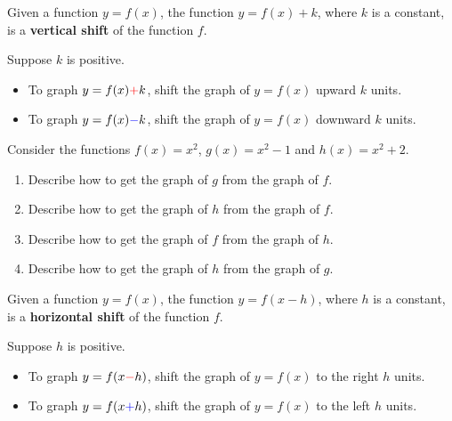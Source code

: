 \begin{definition}
  Given a function \(y=f(x)\), the function \(y=f(x)+k\), where \(k\) is a constant, is a \textbf{vertical shift} of the function \(f\). 
\end{definition}

\begin{howto}
  Suppose $k$ is positive. 
\begin{itemize}
  \item To graph $y=f(x) {\color{red} +}k$, shift the graph of $y=f(x)$ {\color{red}upward} $k$ units. 
  \item To graph $y=f(x) {\color{blue} -}k$, shift the graph of $y=f(x)$ {\color{blue}downward} $k$ units. 
\end{itemize}
\end{howto}

\begin{example}
  Consider the functions $f(x)=x^2$, $g(x)=x^2-1$ and $h(x)=x^2+2$.
  \begin{enumerate}
    \item Describe how to get the graph of $g$ from the graph of $f$.
    \item Describe how to get the graph of $h$ from the graph of $f$.
    \item Describe how to get the graph of $f$ from the graph of $h$.
    \item Describe how to get the graph of $h$ from the graph of $g$.
  \end{enumerate}
\end{example}




\begin{definition}
  Given a function \(y=f(x)\), the function \(y=f(x-h)\), where \(h\) is a constant, is a \textbf{horizontal shift} of the function \(f\). 
  \end{definition}

\begin{howto}
  Suppose $h$ is positive. 
\begin{itemize}
  \item To graph $y=f(x {\color{red} -} h)$, shift the graph of $y=f(x)$ to the {\color{red} right} $h$ units. 
  \item To graph $y=f(x {\color{blue} +} h)$, shift the graph of $y=f(x)$ to the {\color{blue} left} $h$ units. 
\end{itemize}
\end{howto}

